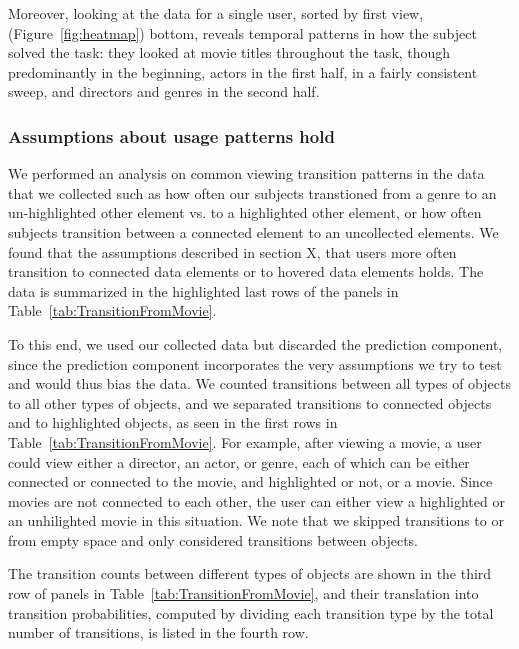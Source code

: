 Moreover, looking at the data for a single user, sorted by first view, (Figure~\ref{fig:heatmap}) bottom, reveals temporal patterns in how the subject solved the task: they looked at movie titles throughout the task, though predominantly in the beginning, actors in the first half, in a fairly consistent sweep, and directors and genres in the second half. 

\subsubsection{Assumptions about usage patterns hold}
We performed an analysis on common viewing transition patterns in the data that we collected such as how often our subjects transtioned from a genre to an un-highlighted other element vs. to a highlighted other element, or how often subjects transition between a connected element to an uncollected elements. We found that the assumptions described in section X, that users more often transition to connected data elements or to hovered data elements holds. The data is summarized in the highlighted last rows of the panels in Table~\ref{tab:TransitionFromMovie}. 

To this end, we used our collected data but discarded the prediction component, since the prediction component incorporates the very assumptions we try to test and would thus bias the data. We counted transitions between all types of objects to all other types of objects, and we separated transitions to connected objects and to highlighted objects, as seen in the first rows in Table~\ref{tab:TransitionFromMovie}.  For example, after viewing a movie, a user could view either a director, an actor, or genre, each of which can be either connected or connected to the movie, and highlighted or not, or a movie. Since movies are not connected to each other, the user can either view a highlighted or an unhilighted movie in this situation. We note that we skipped transitions to or from empty space and only considered transitions between objects. 

The transition counts between different types of objects are shown in the third row of panels in Table~\ref{tab:TransitionFromMovie}, and their translation into transition probabilities, computed by dividing each transition type by the total number of transitions, is listed in the fourth row. 


